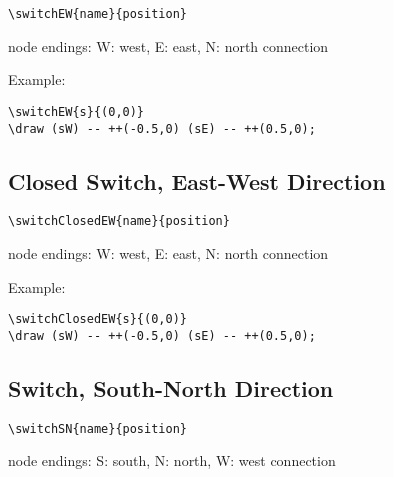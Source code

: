 \documentclass[parskip=full]{scrartcl}
\begin{document}
\begin{verbatim}
\switchEW{name}{position}
\end{verbatim}
node endings: W: west, E: east, N: north connection

Example:\\
\begin{minipage}{0.8\textwidth}
\begin{verbatim}
\switchEW{s}{(0,0)}
\draw (sW) -- ++(-0.5,0) (sE) -- ++(0.5,0);
\end{verbatim}
\end{minipage}
\begin{minipage}{0.19\textwidth}
\end{minipage}

\subsection{Closed Switch, East-West Direction}

\begin{verbatim}
\switchClosedEW{name}{position}
\end{verbatim}
node endings: W: west, E: east, N: north connection

Example:\\
\begin{minipage}{0.8\textwidth}
\begin{verbatim}
\switchClosedEW{s}{(0,0)}
\draw (sW) -- ++(-0.5,0) (sE) -- ++(0.5,0);
\end{verbatim}
\end{minipage}
\begin{minipage}{0.19\textwidth}
\end{minipage}

\subsection{Switch, South-North Direction}

\begin{verbatim}
\switchSN{name}{position}
\end{verbatim}
node endings: S: south, N: north, W: west connection
\end{document}

